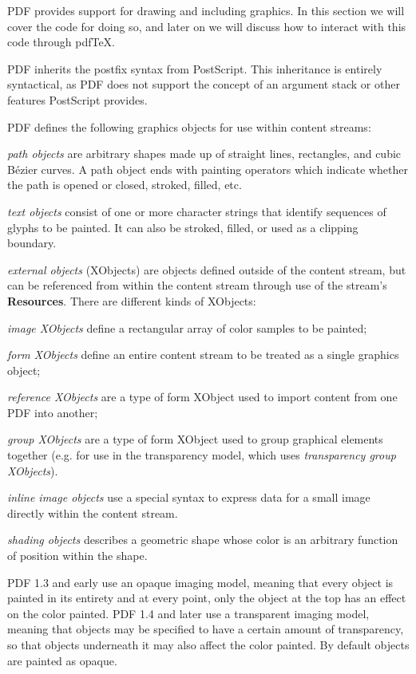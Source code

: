 PDF provides support for drawing and including graphics.
In this section we will cover the code for doing so, and later on we will discuss how to interact with this
code through pdf\TeX.

PDF inherits the postfix syntax from PostScript.
This inheritance is entirely syntactical, as PDF does not support the concept of an argument stack or other
features PostScript provides.

PDF defines the following graphics objects for use within content streams:
\blist
    \item {\it path objects} are arbitrary shapes made up of straight lines, rectangles, and cubic B\'ezier
    curves.
    A path object ends with painting operators which indicate whether the path is opened or closed, stroked,
    filled, etc.
    \item {\it text objects} consist of one or more character strings that identify sequences of glyphs to be
    painted.
    It can also be stroked, filled, or used as a clipping boundary.
    \item {\it external objects} (XObjects) are objects defined outside of the content stream, but can be
    referenced from within the content stream through use of the stream's {\bf Resources}.
    There are different kinds of XObjects:
    \blist
        \item {\it image XObjects} define a rectangular array of color samples to be painted;
        \item {\it form XObjects} define an entire content stream to be treated as a single graphics object;
        \item {\it reference XObjects} are a type of form XObject used to import content from one PDF into
        another;
        \item {\it group XObjects} are a type of form XObject used to group graphical elements together
        (e.g. for use in the transparency model, which uses {\it transparency group XObjects}).
    \elist
    \item {\it inline image objects} use a special syntax to express data for a small image directly within
    the content stream.
    \item {\it shading objects} describes a geometric shape whose color is an arbitrary function of position
    within the shape.
\elist

PDF 1.3 and early use an opaque imaging model, meaning that every object is painted in its entirety and at
every point, only the object at the top has an effect on the color painted.
PDF 1.4 and later use a transparent imaging model, meaning that objects may be specified to have a certain
amount of transparency, so that objects underneath it may also affect the color painted.
By default objects are painted as opaque.



